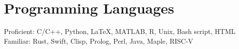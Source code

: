 \section{\sc Programming Languages}
Proficient: C/C++, Python, \LaTeX, MATLAB, R, Unix, Bash script, HTML\\
Familiar: Rust, Swift, Clisp, Prolog, Perl, Java, Maple, RISC-V\\
\endinput